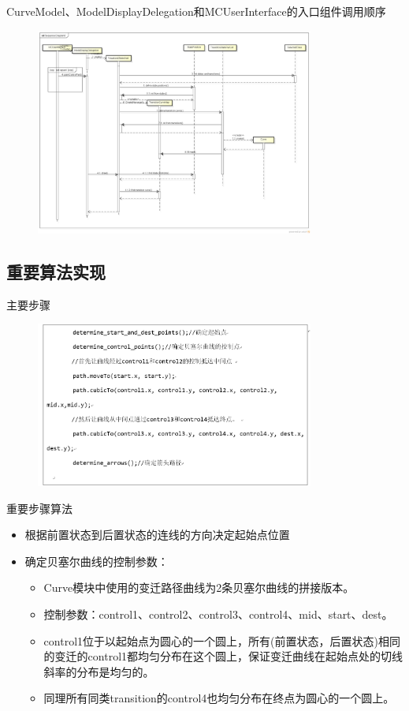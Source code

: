 \documentclass{beamer}
\begin{document}
\begin{frame}{CurveModel、ModelDisplayDelegation和MCUserInterface的入口组件调用顺序}
  \begin{figure}[H]
  \includegraphics[width=3.6in]{img/7.PNG}
  \end{figure}
\end{frame}

\subsection{重要算法实现}
\begin{frame}{主要步骤}
  \begin{figure}[H]
  \includegraphics[width=3.6in]{img/8.PNG}
  \end{figure}
\end{frame}

\begin{frame}{重要步骤算法}
  \begin{itemize}
  \item 根据前置状态到后置状态的连线的方向决定起始点位置 \pause
  \item 确定贝塞尔曲线的控制参数：\pause
    \begin{itemize}
    \item Curve模块中使用的变迁路径曲线为2条贝塞尔曲线的拼接版本。\pause
    \item 控制参数：control1、control2、control3、control4、mid、start、dest。\pause
    \item control1位于以起始点为圆心的一个圆上，所有(前置状态，后置状态)相同的变迁的control1都均匀分布在这个圆上，保证变迁曲线在起始点处的切线斜率的分布是均匀的。\pause
    \item 同理所有同类transition的control4也均匀分布在终点为圆心的一个圆上。\pause
    \end{itemize}
  \end{itemize}
\end{frame}
\end{document}

